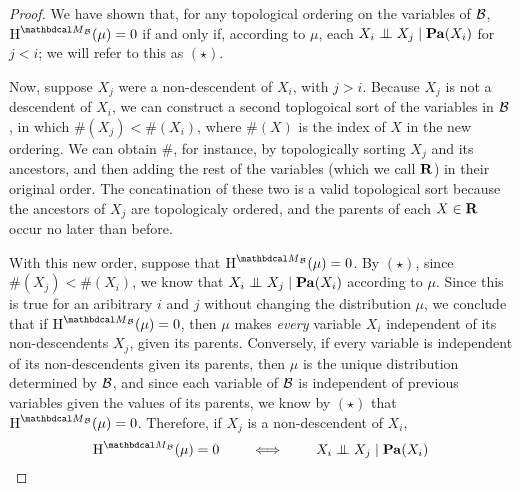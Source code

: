 \begin{proof}
	We have shown that, for any topological ordering on
			the variables of $\cal B$, $\H^{\PDGof{\cal B}}(\mu) =
			0$ if and only if, according to $\mu$,  each $X_i \mathrel{\perp\mspace{-10mu}\perp}
			X_j \mid \mathbf{Pa}(X_i)$ for $j  < i$; we will refer to this
			as $(\star)$. 
	
	Now, suppose $X_j$ were a non-descendent of $X_i$, with $j > i$. Because $X_j$ is not a descendent of $X_i$, we can construct a second toplogoical sort of the variables in $\cal B$, in which $\#(X_j) < \#(X_i)$, where $\#(X)$ is the index of $X$ in the new ordering. 
	We can obtain $\#$, for instance, by topologically sorting $X_j$ and its ancestors, and then adding the rest of the variables (which we call $\bf R$) in their original order. The concatination of these two is a valid topological sort because the ancestors of $X_j$ are topologicaly ordered, and the parents of each $X \in \bf R$ occur no later than before.
	
	
	With this new order, suppose that $\H^{\PDGof{\cal B}}(\mu) = 0$. By $(\star)$, since $\#(X_j) < \#(X_i)$, we know that $X_i \mathrel{\perp\mspace{-10mu}\perp} X_j \mid \mathbf{Pa}(X_i)$ according to $\mu$. Since this is true for an aribitrary $i$ and $j$ without changing the distribution $\mu$, we conclude that if $\H^{\PDGof{\cal B}}(\mu) = 0$, then $\mu$ makes \emph{every} variable $X_i$ independent of its non-descendents $X_j$, given its parents.
	Conversely, if every variable is independent of its non-descendents given its parents, then $\mu$ is the unique distribution determined by $\cal B$, and since each variable of $\cal B$ is independent of previous variables given the values of its parents,  we know by $(\star)$ that $\H^{\PDGof{\cal B}}(\mu) = 0$. Therefore, if $X_j$ is a non-descendent of $X_i$, 
	\[ \H^{\PDGof{\cal B}}(\mu) = 0 \qquad\iff\qquad X_i \CI X_j \mid \Pa(X_i) \] 
	

\end{proof}
